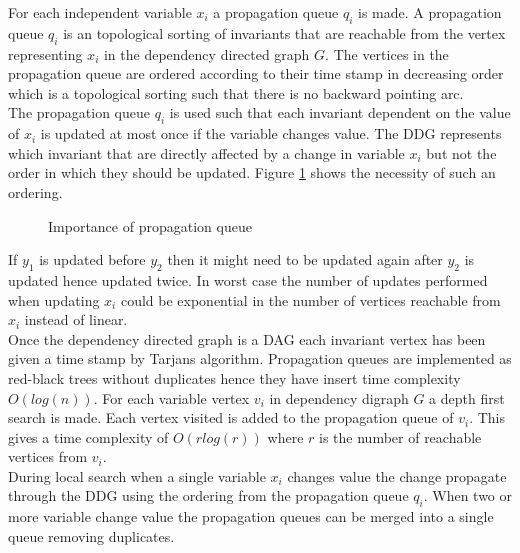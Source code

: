 For each independent variable $x_i$ a propagation queue $q_i$ is made. A propagation queue $q_i$ is an 
topological sorting of invariants that are reachable from the vertex representing $x_i$ in the dependency directed 
graph $G$. The vertices in the propagation queue are ordered according to their time stamp in decreasing 
order which is a topological sorting such that there is no backward pointing arc. \\
The propagation queue $q_i$ is used such that each invariant dependent on the value of $x_i$ is updated at most once if 
the variable changes value. The DDG represents which invariant that are directly affected by a change in variable $x_i$ 
but not the order in which they should be updated. Figure \ref{fig_propqueue} shows the necessity of such an ordering. 
\\
\begin{figure}[b]
\centering
{}  \caption{Importance of propagation queue} \label{fig_propqueue}
\end{figure} 
If $y_1$ is updated before $y_2$ then it might need to be updated again after $y_2$ is updated hence updated 
twice. In worst case the number of updates performed when updating $x_i$ could be exponential in the number of vertices 
reachable from $x_i$ instead of linear. \\ 
Once the dependency directed graph is a DAG each invariant vertex has been given a time stamp by Tarjans algorithm. 
Propagation queues are implemented as red-black trees without duplicates hence they have insert time complexity 
$O(log(n))$. For each variable vertex $v_i$ in dependency digraph $G$ a depth first search is made. Each vertex 
visited is added to the propagation queue of $v_i$. This gives a time complexity of $O(rlog(r))$ where $r$ is the 
number of reachable vertices from $v_i$.  \medskip \\ 
During local search when a single variable $x_i$ changes value the change propagate through the DDG using 
the ordering from the propagation queue $q_i$. When two or more variable change value the propagation queues can be 
merged into a single queue removing duplicates.  